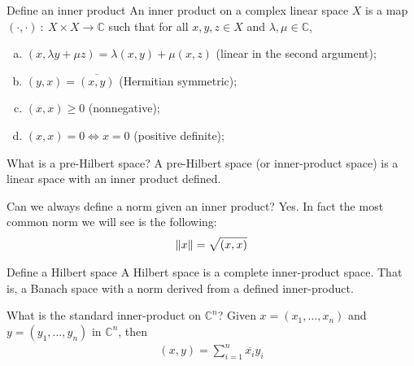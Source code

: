 \documentclass[avery5388,grid,frame]{flashcards}
\def\Cx{\mathbb{C}}
\begin{document}


\begin{flashcard}
    {Define an inner product}
    An inner product on a complex linear space $X$ is a map $(\cdot,\cdot)\ :\ X\times X \rightarrow \Cx$ such that for all $x, y, z \in X$ and $\lambda,\mu \in \Cx$,
    \begin{enumerate}[(a)]
        \item $(x, \lambda y + \mu z) = \lambda(x, y) + \mu(x, z)$ (linear in the second argument);
        \item $(y, x) = \overline{(x, y)}$ (Hermitian symmetric);
        \item $(x, x) \geq 0$ (nonnegative);
        \item $(x, x) = 0 \iff x = 0$ (positive definite);
    \end{enumerate}
\end{flashcard}

\begin{flashcard}
    {What is a pre-Hilbert space?}
    A pre-Hilbert space (or inner-product space) is a linear space with an inner product defined.
\end{flashcard}

\begin{flashcard}
    {Can we always define a norm given an inner product?}
    Yes.  In fact the most common norm we will see is the following:
    \begin{align*}
        \norm{x} = \sqrt{(x, x)}
    \end{align*}
\end{flashcard}

\begin{flashcard}
    {Define a Hilbert space}
    A Hilbert space is a complete inner-product space.  That is, a Banach space with a norm derived from a defined inner-product.
\end{flashcard}

\begin{flashcard}
    {What is the standard inner-product on $\Cx^n$?}
    Given $x = (x_1, \dots, x_n)$ and $y = (y_1, \dots, y_n)$ in $\Cx^n$, then
    \begin{align*}
        (x, y) = \sum_{i=1}^n \overline{x_i}y_i
    \end{align*}
\end{flashcard}
\end{document}
